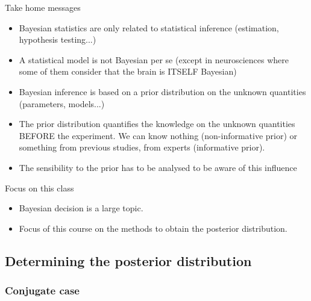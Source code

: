 
\begin{frame}{Take home messages}
\label{TakeHOME}
 

\begin{block}{}
\begin{itemize}
\item Bayesian statistics are only related to statistical inference (estimation, hypothesis testing...) 
\item A statistical model  is not Bayesian per se (except in neurosciences where some of them consider that the brain is ITSELF Bayesian)
\item Bayesian inference  is based on a prior distribution on the unknown quantities (parameters, models...) 
\item The prior distribution quantifies the knowledge on the unknown quantities  BEFORE the experiment. We can know nothing (non-informative prior) or  something from previous studies, from experts (informative prior). 
\item The sensibility to the prior has to be analysed to be aware of this influence
\end{itemize}
\end{block}
\end{frame}


\begin{frame}{Focus on this class}
\begin{itemize}
\item Bayesian decision is a large topic. 
\item Focus of this course on the methods to obtain the posterior distribution.
\end{itemize}
 \end{frame}

\subsection{Determining the posterior distribution}

\subsubsection{Conjugate case}

